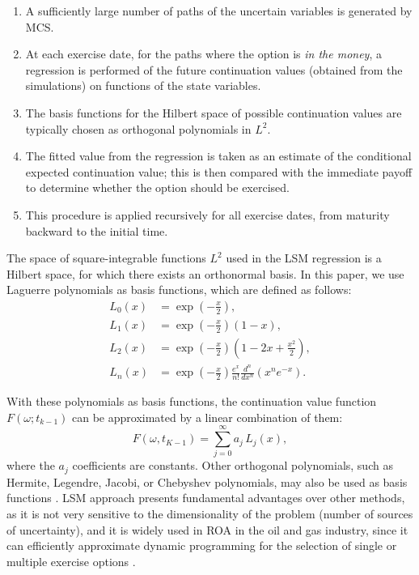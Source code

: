 \documentclass[pdflatex,sn-basic]{sn-jnl}%
\theoremstyle{thmstyleone}%
\theoremstyle{thmstyletwo}%
\theoremstyle{thmstylethree}%
\begin{document}
\begin{enumerate}[label=(\roman*)]
\item A sufficiently large number of paths of the uncertain variables is generated by MCS.
\item At each exercise date, for the paths where the option is \textit{in the money}, a regression is performed of the future continuation values (obtained from the simulations) on functions of the state variables.
\item The basis functions for the Hilbert space of possible continuation values are typically chosen as orthogonal polynomials in $L^2$.
\item The fitted value from the regression is taken as an estimate of the conditional expected continuation value; this is then compared with the immediate payoff to determine whether the option should be exercised.
\item This procedure is applied recursively for all exercise dates, from maturity backward to the initial time.
\end{enumerate}

The space of square-integrable functions $L^2$ used in the LSM regression is a Hilbert space, for which there exists an orthonormal basis. In this paper, we use Laguerre polynomials as basis functions, which are defined as follows:
\begin{align}
L_0(x) &= \exp\left(-\frac{x}{2}\right), \\
L_1(x) &= \exp\left(-\frac{x}{2}\right) (1 - x), \\
L_2(x) &= \exp\left(-\frac{x}{2}\right) \left(1 - 2x + \frac{x^2}{2}\right), \\
L_n(x) &= \exp\left(-\frac{x}{2}\right) \frac{e^{x}}{n!} \frac{d^n}{dx^n} \left( x^n e^{-x} \right).
\end{align}

With these polynomials as basis functions, the continuation value function $F(\omega; t_{k-1})$ can be approximated by a linear combination of them:
\begin{equation}
F(\omega, t_{K-1}) = \sum_{j=0}^{\infty} a_j\, L_j(x),
\end{equation}
where the $a_j$ coefficients are constants. Other orthogonal polynomials, such as Hermite, Legendre, Jacobi, or Chebyshev polynomials, may also be used as basis functions \citep{ref14}. LSM approach presents fundamental advantages over other methods, as it is not very sensitive to the dimensionality of the problem (number of sources of uncertainty), and it is widely used in ROA in the oil and gas industry, since it can efficiently approximate dynamic programming for the selection of single or multiple exercise options \citep{ref15}.
\end{document}
